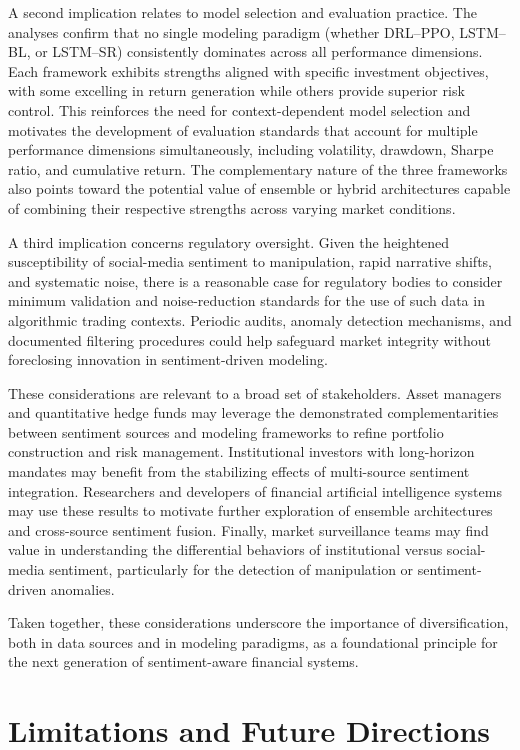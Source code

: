 A second implication relates to model selection and evaluation practice. The analyses confirm that no single modeling paradigm (whether DRL--PPO, LSTM--BL, or LSTM--SR) consistently dominates across all performance dimensions. Each framework exhibits strengths aligned with specific investment objectives, with some excelling in return generation while others provide superior risk control. This reinforces the need for context-dependent model selection and motivates the development of evaluation standards that account for multiple performance dimensions simultaneously, including volatility, drawdown, Sharpe ratio, and cumulative return. The complementary nature of the three frameworks also points toward the potential value of ensemble or hybrid architectures capable of combining their respective strengths across varying market conditions.
 
A third implication concerns regulatory oversight. Given the heightened susceptibility of social-media sentiment to manipulation, rapid narrative shifts, and systematic noise, there is a reasonable case for regulatory bodies to consider minimum validation and noise-reduction standards for the use of such data in algorithmic trading contexts. Periodic audits, anomaly detection mechanisms, and documented filtering procedures could help safeguard market integrity without foreclosing innovation in sentiment-driven modeling.
 
These considerations are relevant to a broad set of stakeholders. Asset managers and quantitative hedge funds may leverage the demonstrated complementarities between sentiment sources and modeling frameworks to refine portfolio construction and risk management. Institutional investors with long-horizon mandates may benefit from the stabilizing effects of multi-source sentiment integration. Researchers and developers of financial artificial intelligence systems may use these results to motivate further exploration of ensemble architectures and cross-source sentiment fusion. Finally, market surveillance teams may find value in understanding the differential behaviors of institutional versus social-media sentiment, particularly for the detection of manipulation or sentiment-driven anomalies.
 
Taken together, these considerations underscore the importance of diversification, both in data sources and in modeling paradigms, as a foundational principle for the next generation of sentiment-aware financial systems.


\section{Limitations and Future Directions}
\label{sec:limitations_future}

